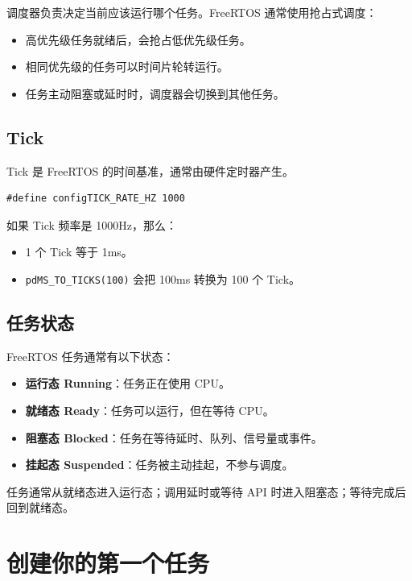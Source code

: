 \documentclass[12pt,a4paper]{ctexart}
\begin{document}
调度器负责决定当前应该运行哪个任务。FreeRTOS 通常使用抢占式调度：

\begin{itemize}
    \item 高优先级任务就绪后，会抢占低优先级任务。
    \item 相同优先级的任务可以时间片轮转运行。
    \item 任务主动阻塞或延时时，调度器会切换到其他任务。
\end{itemize}

\subsection{Tick}

Tick 是 FreeRTOS 的时间基准，通常由硬件定时器产生。

\begin{lstlisting}
#define configTICK_RATE_HZ 1000
\end{lstlisting}

如果 Tick 频率是 1000Hz，那么：

\begin{itemize}
    \item 1 个 Tick 等于 1ms。
    \item \texttt{pdMS\_TO\_TICKS(100)} 会把 100ms 转换为 100 个 Tick。
\end{itemize}

\subsection{任务状态}

FreeRTOS 任务通常有以下状态：

\begin{itemize}
    \item \textbf{运行态 Running}：任务正在使用 CPU。
    \item \textbf{就绪态 Ready}：任务可以运行，但在等待 CPU。
    \item \textbf{阻塞态 Blocked}：任务在等待延时、队列、信号量或事件。
    \item \textbf{挂起态 Suspended}：任务被主动挂起，不参与调度。
\end{itemize}

任务通常从就绪态进入运行态；调用延时或等待 API 时进入阻塞态；等待完成后回到就绪态。

\section{创建你的第一个任务}
\end{document}
